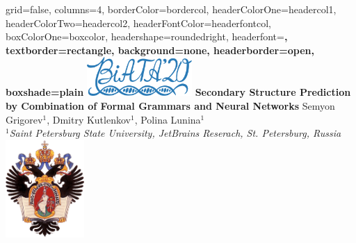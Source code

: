 \documentclass[a0paper,portrait]{baposter}
\begin{document}
\setlength{\fboxsep}{0pt}


\begin{poster}{
grid=false,
columns=4,
borderColor=bordercol, %
headerColorOne=headercol1, %
headerColorTwo=headercol2, %
headerFontColor=headerfontcol, %
boxColorOne=boxcolor, %
headershape=roundedright, %
headerfont=\Large\sf\bf, %
textborder=rectangle,
background=none,
headerborder=open, %
boxshade=plain
}
{\includegraphics[width=4cm]{BiATA2020.png}}
%
%
{ \bf  \huge {Secondary Structure Prediction by Combination of Formal Grammars and Neural Networks} }  %
{\vspace{0.3em} \smaller Semyon Grigorev$^1$, Dmitry Kutlenkov$^1$, Polina Lunina$^1$ \\  %
\smaller \it $^1${Saint Petersburg State University, JetBrains Reserach, St. Petersburg, Russia } \\ %
}
{\includegraphics[width=3cm]{SPbGU_Logo.png}} %



\end{poster}
\end{document}
